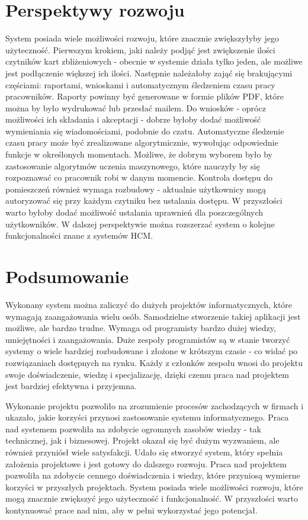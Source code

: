 \section{Perspektywy rozwoju}

System posiada wiele możliwości rozwoju, które znacznie zwiększyłyby jego użyteczność. Pierwszym krokiem, jaki należy podjąć jest zwiększenie ilości czytników kart zbliżeniowych - obecnie w systemie działa tylko jeden, ale możliwe jest podłączenie większej ich ilości. Następnie należałoby zająć się brakującymi częściami: raportami, wnioskami i automatycznym śledzeniem czasu pracy pracowników. Raporty powinny być generowane w formie plików PDF, które można by było wydrukować lub przesłać mailem. Do wniosków - oprócz możliwości ich składania i akceptacji - dobrze byłoby dodać możliwość wymieniania się wiadomościami, podobnie do czatu. Automatyczne śledzenie czasu pracy może być zrealizowane algorytmicznie, wywołując odpowiednie funkcje w określonych momentach. Możliwe, że dobrym wyborem było by zastosowanie algorytmów uczenia maszynowego, które nauczyły by się rozpoznawać co pracownik robi w danym momencie. Kontrola dostępu do pomieszczeń również wymaga rozbudowy - aktualnie użytkownicy mogą autoryzować się przy każdym czytniku bez ustalania dostępu. W przyszłości warto byłoby dodać możliwość ustalania uprawnień dla poszczególnych użytkowników. W dalszej perspektywie można rozszerzać system o kolejne funkcjonalności znane z systemów HCM.

\section{Podsumowanie}

Wykonany system można zaliczyć do dużych projektów informatycznych, które wymagają zaangażowania wielu osób. Samodzielne stworzenie takiej aplikacji jest możliwe, ale bardzo trudne. Wymaga od programisty bardzo dużej wiedzy, umiejętności i zaangażowania. Duże zespoły programistów są w stanie tworzyć systemy o wiele bardziej rozbudowane i złożone w krótszym czasie - co widać po rozwiązaniach dostępnych na rynku. Każdy z członków zespołu wnosi do projektu swoje doświadczenie, wiedzę i specjalizację, dzięki czemu praca nad projektem jest bardziej efektywna i przyjemna.

Wykonanie projektu pozwoliło na zrozumienie procesów zachodzących w firmach i ukazało, jakie korzyści przynosi zastosowanie systemu informatycznego. Praca nad systemem pozwoliła na zdobycie ogromnych zasobów wiedzy - tak technicznej, jak i biznesowej. Projekt okazał się być dużym wyzwaniem, ale również przyniósł wiele satysfakcji. Udało się stworzyć system, który spełnia założenia projektowe i jest gotowy do dalszego rozwoju. Praca nad projektem pozwoliła na zdobycie cennego doświadczenia i wiedzy, które przyniosą wymierne korzyści w przyszłych projektach. System posiada wiele możliwości rozwoju, które mogą znacznie zwiększyć jego użyteczność i funkcjonalność. W przyszłości warto kontynuować prace nad nim, aby w pełni wykorzystać jego potencjał.